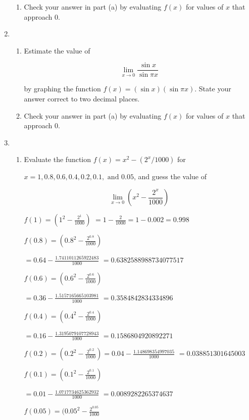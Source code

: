 \documentclass{article}
\begin{document}
\begin{enumerate}
\begin{enumerate}
				\item Check your answer in part (a) by evaluating $f(x)$ for values of $x$ that approach 0.
			\end{enumerate}
		
		\item
			\begin{enumerate}
				\item Estimate the value of
				
					$$\lim \limits _{x \to 0} \frac{\sin x}{\sin \pi x}$$
					
					by graphing the function $f(x) = (\sin x)(\sin \pi x)$. State your answer correct to
					two decimal places.
					
				\item Check your answer in part (a) by evaluating  $f(x)$ for values of $x$ that approach 0.
			\end{enumerate}
			
		\item 
			\begin{enumerate}
				\item Evaluate the function $f(x) = x^2 - (2^x/1000)$ for 
				
				$x = 1, 0.8, 0.6, 0.4, 0.2, 0.1, \text{ and } 0.05$, and guess the value of
				
					$$\lim \limits _{x \to 0} (x^2 - \frac{2^x}{1000})$$
					
				$f(1) = (1^2 - \frac{2^1}{1000})$ 
				$= 1 - \frac{2}{1000} = 1 - 0.002 = 0.998$
				
				$f(0.8) = (0.8^2 - \frac{2^{0.8}}{1000}) $
				
				$ = 0.64 - \frac{1.7411011265922483}{1000}$
				$= 0.6382588988734077517$
				
				$f(0.6) = (0.6^2 - \frac{2^{0.6}}{1000})$ 
				
				$ = 0.36 - \frac{1.5157165665103981}{1000}$
				$ = 0.3584842834334896$
				
				$f(0.4) = (0.4^2 - \frac{2^{0.4}}{1000}) $ 
				
				$= 0.16 - \frac{1.3195079107728943}{1000}$
				$ = 0.1586804920892271$
				
				$f(0.2) = (0.2^2 - \frac{2^{0.2}}{1000}) = 0.04 - \frac{1.148698354997035}{1000}$
				$ = 0.038851301645003$
				
				$f(0.1) = (0.1^2 - \frac{2^{0.1}}{1000})$
				
				$ = 0.01 - \frac{1.0717734625362932}{1000}$
				$ = 0.0089282265374637$
				
				$f(0.05) = (0.05^2 - \frac{2^{0.05}}{1000} $
				

\end{enumerate}
\end{enumerate}
\end{document}
